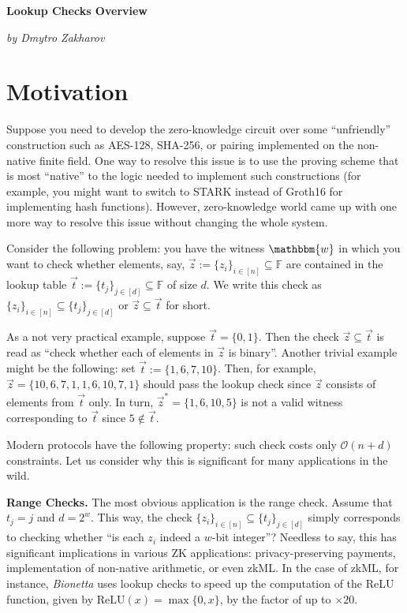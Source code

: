 \documentclass{lookup-template}
\begin{document}
\begin{center}
    \textbf{\Huge{Lookup Checks Overview}}

    \textit{by Dmytro Zakharov}
\end{center}

\section*{Motivation}

Suppose you need to develop the zero-knowledge circuit over some ``unfriendly''
construction such as AES-128, SHA-256, or pairing implemented on the non-native
finite field. One way to resolve this issue is to use the proving scheme that is
most ``native'' to the logic needed to implement such constructions (for
example, you might want to switch to STARK instead of Groth16 for implementing
hash functions). However, zero-knowledge world came up with one more way to
resolve this issue without changing the whole system.

Consider the following problem: you have the witness $\mathbbm{w}$ in which you
want to check whether elements, say, $\vec{z} := \{z_i\}_{i \in [n]} \subseteq
\mathbb{F}$ are contained in the lookup table $\vec{t} := \{t_j\}_{j \in [d]}
\subseteq \mathbb{F}$ of size $d$. We write this check as $\{z_i\}_{i \in [n]}
\subseteq \{t_j\}_{j \in [d]}$ or $\vec{z} \subseteq \vec{t}$ for short.

\begin{example}
    As a not very practical example, suppose $\vec{t} = \{0,1\}$. Then the check
    $\vec{z} \subseteq \vec{t}$ is read as ``check whether each of elements in
    $\vec{z}$ is binary''. Another trivial example might be the following: set
    $\vec{t} := \{1,6,7,10\}$. Then, for example, $\vec{z} =
    \{10,6,7,1,1,6,10,7,1\}$ should pass the lookup check since $\vec{z}$
    consists of elements from $\vec{t}$ only. In turn, $\vec{z}^*=\{1,6,10,5\}$
    is not a valid witness corresponding to $\vec{t}$ since $5 \not\in \vec{t}$.
\end{example}

Modern protocols have the following property: such check costs only
$\mathcal{O}(n+d)$ constraints. Let us consider why this is significant for many
applications in the wild.

\textbf{Range Checks.} The most obvious application is the range check. Assume
that $t_j=j$ and $d=2^w$. This way, the check $\{z_i\}_{i \in [n]} \subseteq
\{t_j\}_{j \in [d]}$ simply corresponds to checking whether ``is each $z_i$
indeed a $w$-bit integer''? Needless to say, this has significant implications
in various ZK applications: privacy-preserving payments, implementation of
non-native arithmetic, or even zkML. In the case of zkML, for instance,
\textit{Bionetta} uses lookup checks to speed up the computation of the ReLU
function, given by $\text{ReLU}(x) = \max\{0,x\}$, by the factor of up to
$\times 20$.
\end{document}
